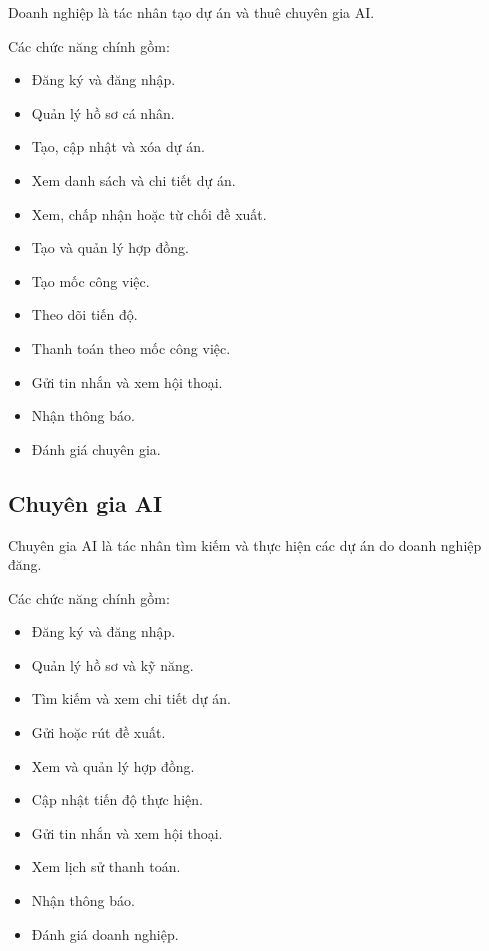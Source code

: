 Doanh nghiệp là tác nhân tạo dự án và thuê chuyên gia AI.

Các chức năng chính gồm:

\begin{itemize}
    \item Đăng ký và đăng nhập.
    \item Quản lý hồ sơ cá nhân.
    \item Tạo, cập nhật và xóa dự án.
    \item Xem danh sách và chi tiết dự án.
    \item Xem, chấp nhận hoặc từ chối đề xuất.
    \item Tạo và quản lý hợp đồng.
    \item Tạo mốc công việc.
    \item Theo dõi tiến độ.
    \item Thanh toán theo mốc công việc.
    \item Gửi tin nhắn và xem hội thoại.
    \item Nhận thông báo.
    \item Đánh giá chuyên gia.
\end{itemize}


\subsection{Chuyên gia AI}

Chuyên gia AI là tác nhân tìm kiếm và thực hiện các dự án do doanh nghiệp đăng.

Các chức năng chính gồm:

\begin{itemize}
    \item Đăng ký và đăng nhập.
    \item Quản lý hồ sơ và kỹ năng.
    \item Tìm kiếm và xem chi tiết dự án.
    \item Gửi hoặc rút đề xuất.
    \item Xem và quản lý hợp đồng.
    \item Cập nhật tiến độ thực hiện.
    \item Gửi tin nhắn và xem hội thoại.
    \item Xem lịch sử thanh toán.
    \item Nhận thông báo.
    \item Đánh giá doanh nghiệp.
\end{itemize}

